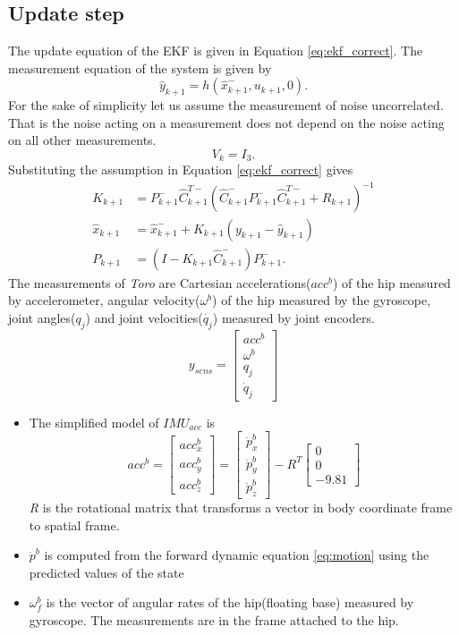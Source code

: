 \subsection{Update step}
\label{subsec:toro_update}
The update equation of the EKF is given in Equation \ref{eq:ekf_correct}. The measurement equation of the system is given by $$\hat{y}_{k+1} = h(\hat{x}_{k+1}^-,u_{k+1},0).$$ For the sake of simplicity let us assume the measurement of noise uncorrelated. That is the noise acting on a measurement does not depend on the noise acting on all other measurements. $$V_k = I_3.$$ Substituting the assumption in Equation \ref{eq:ekf_correct} gives
\begin{equation}
\label{eq:correct}
\begin{split}
K_{k+1} &= P_{k+1}^-\hat{C}_{k+1}^{T-}(\hat{C}_{k+1}^-P_{k+1}^-\hat{C}_{k+1}^{T-} + R_{k+1})^{-1}\\
\hat{x}_{k+1} &= \hat{x}_{k+1}^- + K_{k+1}(y_{k+1}-\hat{y}_{k+1})\\
P_{k+1} &= (I- K_{k+1}\hat{C}_{k+1}^-)P_{k+1}^-.
\end{split}
\end{equation}
The measurements of \emph{Toro} are Cartesian accelerations($acc^b$) of the hip measured by accelerometer, angular velocity($\omega^b$) of the hip measured by the gyroscope, joint angles($q_j$) and joint velocities($\dot{q_j}$) measured by joint encoders.
\begin{equation}
    \label{eq:y_sens}
     y_{sens} = \begin{bmatrix} acc^b \\ \omega^b \\ q_j \\ \dot{q}_j \end{bmatrix} 
\end{equation}
\begin{itemize}
    \item The simplified model of $IMU_{acc}$ is $$ acc^b= \begin{bmatrix} acc^b_x \\ acc^b_y \\ acc^b_z \end{bmatrix} =  \begin{bmatrix}\ddot{p}_x^b \\ \ddot{p}_y^b \\ \ddot{p}_z^b \end{bmatrix} - R^T \begin{bmatrix}0 \\0 \\-9.81 \end{bmatrix}$$ \emph{R} is the rotational matrix that transforms a vector in body coordinate frame to spatial frame.
    \item $\ddot{p}^b$ is computed from the forward dynamic equation \ref{eq:motion} using the predicted values of the state
    \item $\omega_{f}^{b} $ is the vector of angular rates of the hip(floating base) measured by gyroscope. The measurements are in the frame attached to the hip. 
\end{itemize}
